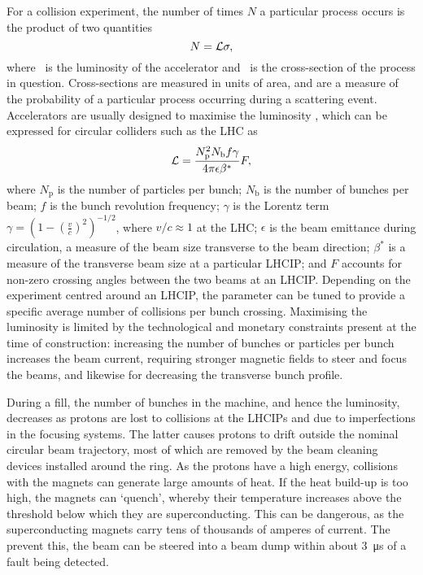 For a collision experiment, the number of times $N$ a particular process occurs 
is the product of two quantities
\begin{equation}
  N = \mathcal{L}\sigma,
  \label{eqn:intro:lhc:lumi_xsec}
\end{equation}
where \lumi\ is the luminosity of the accelerator and \xsec\ is the 
cross-section of the process in question.
Cross-sections are measured in units of area, and are a measure of the 
probability of a particular process occurring during a scattering event.
Accelerators are usually designed to maximise the luminosity \lumi, which can 
be expressed for circular colliders such as the \ac{LHC} as
\begin{equation}
  \mathcal{L} = \frac{N_{\text{p}}^{2}N_{\text{b}}f\gamma}{4\pi\epsilon\beta^{*}}F,
\end{equation}
where $N_{\text{p}}$ is the number of particles per bunch; $N_{\text{b}}$ is 
the number of bunches per beam; $f$ is the bunch revolution frequency; $\gamma$ 
is the Lorentz term $\gamma = {(1 - {(\frac{v}{c})}^{2})}^{-1/2}$, where $v/c 
\approx 1$ at the \ac{LHC}; $\epsilon$ is the beam emittance during 
circulation, a measure of the beam size transverse to the beam direction; 
$\beta^{*}$ is a measure of the transverse beam size at a particular 
\ac{LHCIP}; and $F$ accounts for non-zero crossing angles between the two beams 
at an \ac{LHCIP}.
Depending on the experiment centred around an \ac{LHCIP}, the \betastar 
parameter can be tuned to provide a specific average number of collisions per 
bunch crossing.
Maximising the luminosity is limited by the technological and monetary 
constraints present at the time of construction: increasing the number of 
bunches or particles per bunch increases the beam current, requiring stronger 
magnetic fields to steer and focus the beams, and likewise for decreasing the 
transverse bunch profile.

During a fill, the number of bunches in the machine, and hence the luminosity, 
decreases as protons are lost to collisions at the \acp{LHCIP} and due to 
imperfections in the focusing systems.
The latter causes protons to drift outside the nominal circular beam 
trajectory, most of which are removed by the beam cleaning devices installed 
around the ring.
As the protons have a high energy, collisions with the magnets can generate 
large amounts of heat.
If the heat build-up is too high, the magnets can `quench', whereby their 
temperature increases above the threshold below which they are superconducting.
This can be dangerous, as the superconducting magnets carry tens of thousands 
of amperes of current.
The prevent this, the beam can be steered into a beam dump within about 
\SI{3}{\micro\second} of a fault being detected.

